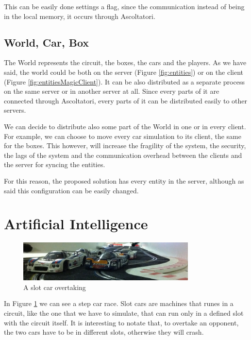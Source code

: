 This can be easily done settings a flag, since the communication instead of being in the local memory, it occurs through Ascoltatori.

\subsection{World, Car, Box}

The World represents the circuit, the boxes, the cars and the players. As we have said, the world could be both on the server (Figure \ref{fig:entities}) or on the client (Figure \ref{fig:entitiesMagicClient}). It can be also distributed as a separate process on the same server or in another server at all. Since every parts of it are connected through Ascoltatori, every parts of it can be distributed easily to other servers.

We can decide to distribute also some part of the World in one or in every client. For example, we can choose to move every car simulation to its client, the same for the boxes. This however, will increase the fragility of the system, the security, the lags of the system and the communication overhead between the clients and the server for  syncing the entities.

For this reason, the proposed solution has every entity in the server, although as said this configuration can be easily changed.

\section{Artificial Intelligence}

\begin{figure}[H]
\centering %
\includegraphics[width=0.8\textwidth]{./img/overtaking.jpg}
\caption{A slot car overtaking}
\label{fig:overtaking}
\end{figure}

In Figure \ref{fig:overtaking} we can see a step car race. Slot cars are machines that runes in a circuit, like the one that we have to simulate, that can run only in a defined slot with the circuit itself. It is interesting to notate that, to overtake an opponent, the two cars have to be in different slots, otherwise they will crash.

